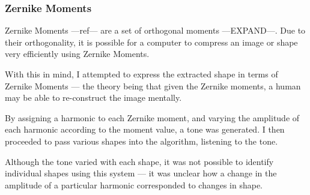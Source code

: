\subsubsection{Zernike Moments}
Zernike Moments ---ref--- are a set of orthogonal moments ---EXPAND---. Due to their orthogonality, it is possible for a computer to compress an image or shape very efficiently using Zernike Moments. 

With this in mind, I attempted to express the extracted shape in terms of Zernike Moments --- the theory being that given the Zernike moments, a human may be able to re-construct the image mentally.

By assigning a harmonic to each Zernike moment, and varying the amplitude of each harmonic according to the moment value, a tone was generated. I then proceeded to pass various shapes into the algorithm, listening to the tone.

Although the tone varied with each shape, it was not possible to identify individual shapes using this system --- it was unclear how a change in the amplitude of a particular harmonic corresponded to changes in shape. 

